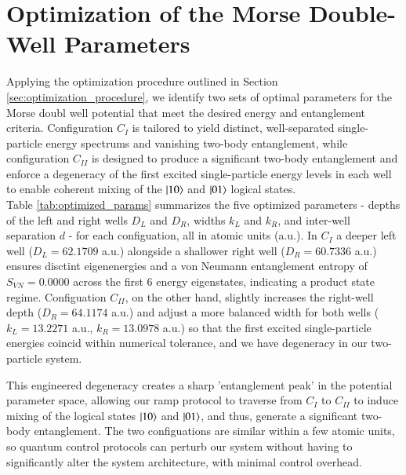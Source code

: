 \documentclass{subfiles}
\begin{document}
\section{Optimization of the Morse Double-Well Parameters}\label{sec:optimization_result}
Applying the optimization procedure outlined in Section \ref{sec:optimization_procedure}, we identify two sets of optimal parameters for the Morse doubl well potential that meet the desired energy and entanglement criteria. Configuration $C_I$ is tailored to yield distinct, well-separated single-particle energy spectrums and vanishing two-body entanglement, while configuration $C_{II}$ is designed to produce a significant two-body entanglement and enforce a degeneracy of the first excited single-particle energy levels in each well to enable coherent mixing of the $\ket{10}$ and $\ket{01}$ logical states.
\\ 

Table \ref{tab:optimized_params} summarizes the five optimized parameters - depths of the left and right wells $D_L$ and $D_R$, widths $k_L$ and $k_R$, and inter-well separation $d$ -  for each configuation, all in atomic units (a.u.). In $C_I$ a deeper left well ($D_L = 62.1709$ a.u.) alongside a shallower right well ($D_R = 60.7336$ a.u.) ensures disctint eigenenergies and a von Neumann entanglement entropy of $S_{VN} = 0.0000$ across the first 6 energy eigenstates, indicating a product state regime. Configuation $C_{II}$, on the other hand, slightly increases the right-well depth ($D_R = 64.1174$ a.u.) and adjust a more balanced width for both wells ($k_L = 13.2271$ a.u., $k_R = 13.0978$ a.u.) so that the first excited single-particle energies coincid within numerical tolerance, and we have degeneracy in our two-particle system.

This engineered degeneracy creates a sharp 'entanglement peak' in the potential parameter space, allowing our ramp protocol to traverse from $C_I$ to $C_{II}$ to induce mixing of the logical states $\ket{10}$ and $\ket{01}$, and thus, generate a significant two-body entanglement. The two configuations are similar within a few atomic units, so quantum control protocols can perturb our system without having to significantly alter the system architecture, with minimal control overhead. \\
\end{document}
